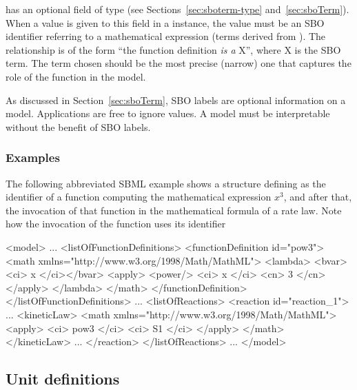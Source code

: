 \FunctionDefinition has an optional  field of type
 (see Sections~\ref{sec:sboterm-type}
and~\ref{sec:sboTerm}).  When a value is given to this field in a
\FunctionDefinition instance, the value must be an SBO identifier
referring to a mathematical expression (\ie terms derived from
\sbomathformula).  The relationship is of the form ``the function
definition \emph{is a} X'', where X is the SBO term.  The term
chosen should be the most precise (narrow) one that captures the
role of the function in the model.

As discussed in Section~\ref{sec:sboTerm}, SBO labels are optional
information on a model.  Applications are free to ignore
 values.  A model must be interpretable without the
benefit of SBO labels.


\subsubsection{Examples}

The following abbreviated SBML example shows a \FunctionDefinition
structure defining  as the identifier of a function
computing the mathematical expression $x^{3}$, and after that, the
invocation of that function in the mathematical formula of a rate
law.  Note how the invocation of the function uses its identifier
\begin{example}
<model>
    ...
    <listOfFunctionDefinitions>
        <functionDefinition id="pow3">
            <math xmlns="http://www.w3.org/1998/Math/MathML">
                <lambda>
                    <bvar><ci> x </ci></bvar>
                    <apply>
                        <power/>
                        <ci> x </ci>
                        <cn> 3 </cn>
                    </apply>
                </lambda>
            </math>
        </functionDefinition>
    </listOfFunctionDefinitions>
    ...
    <listOfReactions>
        <reaction id="reaction_1">
            ...
            <kineticLaw>
                <math xmlns="http://www.w3.org/1998/Math/MathML">
                    <apply>
                        <ci> pow3 </ci>
                        <ci> S1 </ci>
                     </apply>
                </math>
            </kineticLaw>
            ...
        </reaction>
    </listOfReactions>
    ...
</model>
\end{example}


\subsection{Unit definitions}
\label{sec:unitdefinitions}

